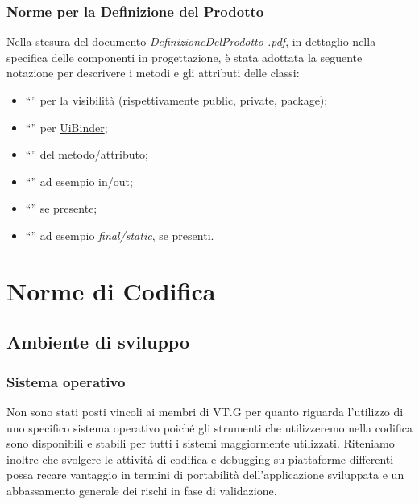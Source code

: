 \subsection{Norme per la Definizione del Prodotto}
Nella stesura del documento \emph{DefinizioneDelProdotto-\versioneDP.pdf}, in
dettaglio nella specifica delle componenti in progettazione, \`e stata adottata
la seguente notazione per descrivere i metodi e gli attributi delle classi:
\begin{itemize}
  \item ``\bo{+, -, \#}'' per la visibilit\`a (rispettivamente public, private,
  package);
  \item ``'' per \underline{UiBinder};
  \item ``'' del metodo/attributo;
  \item ``'' ad esempio in/out;
  \item ``'' se presente;
  \item ``'' ad esempio \emph{final/static}, se presenti.
\end{itemize}

\newpage
\chapter{Norme di Codifica}
\thispagestyle{fancy}
 
\section{Ambiente di sviluppo}
\subsection{Sistema operativo}
Non sono stati posti vincoli ai membri di VT.G per quanto riguarda l'utilizzo di
uno specifico sistema operativo poich\'e gli strumenti che utilizzeremo nella
codifica sono disponibili e stabili per tutti i sistemi maggiormente utilizzati.
Riteniamo inoltre che svolgere le attivit\`a di codifica e debugging su
piattaforme differenti possa recare vantaggio in termini di portabilit\`a
dell'applicazione sviluppata e un abbassamento generale dei rischi in fase di
validazione.

